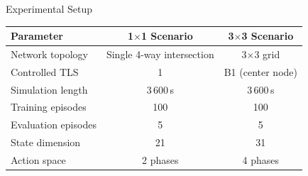 \documentclass[final,18pt]{beamer}
\newlength{\sepwidth}
\newlength{\colwidth}
\newcommand{\separatorcolumn}{\begin{column}{\sepwidth}\end{column}}
\begin{document}
\begin{frame}[t]
\begin{columns}[t]
\begin{column}{\colwidth}
\begin{block}{Experimental Setup}
    \begin{center}
    \begin{tabular}{lcc}
      \toprule
      \textbf{Parameter} & \textbf{1$\times$1 Scenario} & \textbf{3$\times$3 Scenario} \\
      \midrule
      Network topology    & Single 4-way intersection & 3$\times$3 grid \\
      Controlled TLS      & 1                         & B1 (center node) \\
      Simulation length   & 3\,600\,s                 & 3\,600\,s \\
      Training episodes   & 100                       & 100 \\
      Evaluation episodes & 5                         & 5 \\
      State dimension     & 21                        & 31 \\
      Action space        & 2 phases                  & 4 phases \\
      \bottomrule
    \end{tabular}
    \end{center}

    \vspace{0.4cm}
  \end{block}



\end{column}

\separatorcolumn

\begin{column}{\colwidth}


\end{column}
\end{columns}
\end{frame}
\end{document}
